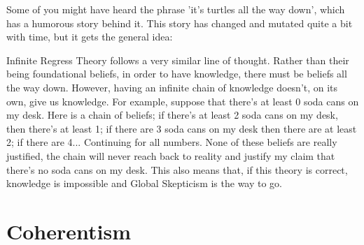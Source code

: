 Some of you might have heard the phrase 'it's turtles all the way down', which has a humorous story behind it.  This story has changed and mutated quite a bit with time, but it gets the general idea:


Infinite Regress Theory follows a very similar line of thought. Rather than their being foundational beliefs, in order to have knowledge, there must be beliefs all the way down.  However, having an infinite chain of knowledge doesn't, on its own, give us knowledge. For example, suppose that there's at least 0 soda cans on my desk. Here is a chain of beliefs; if there's at least 2 soda cans on my desk, then there's at least 1; if there are 3 soda cans on my desk then there are at least 2; if there are 4... Continuing for all numbers. None of these beliefs are really justified,  the chain will never reach back to reality and justify my claim that there's no soda cans on my desk. This also means that, if this theory is correct, knowledge is impossible and Global Skepticism is the way to go. 

\section{Coherentism}

